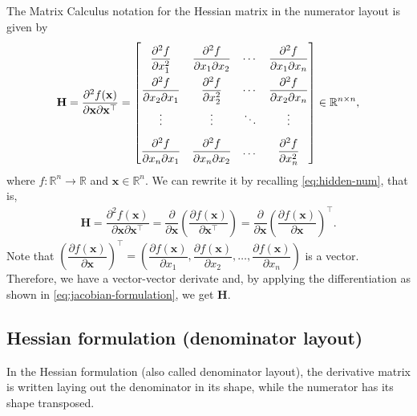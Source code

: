 \documentclass{article}
\begin{document}
The Matrix Calculus notation for the Hessian matrix in the numerator layout is given by
\begin{align}
    \label{eq:hessian-eq-numerator}
    \mathbf{H} = \dfrac{\partial^{2} f(\mathbf{x})}{\partial \mathbf{x} \partial \mathbf{x}^\top} = \renewcommand{\arraystretch}{2.2}\begin{bmatrix}
        \dfrac{\partial^{2} f}{\partial x_1^2} & \dfrac{\partial^{2} f}{\partial x_1 \partial x_2} & \cdots & \dfrac{\partial^{2} f}{\partial x_1 \partial x_n} \\
        \dfrac{\partial^{2} f}{\partial x_2 \partial x_1} & \dfrac{\partial^{2} f}{\partial x_2^2} & \cdots & \dfrac{\partial^{2} f}{\partial x_2 \partial x_n} \\
        \vdots & \vdots & \ddots & \vdots \\
        \dfrac{\partial^{2} f}{\partial x_n \partial x_1} & \dfrac{\partial^{2} f}{\partial x_n \partial x_2} & \dots & \dfrac{\partial^{2} f}{\partial x_n^2}
    \end{bmatrix} \in \mathbb{R}^{n \times n},
\end{align}
where \(f: \mathbb{R}^{n} \rightarrow \mathbb{R}\) and \(\mathbf{x} \in \mathbb{R}^{n}\). We can rewrite it by recalling \eqref{eq:hidden-num}, that is,
\begin{align}
    \mathbf{H} = \dfrac{\partial^{2} f(\mathbf{x})}{\partial \mathbf{x} \partial \mathbf{x}^\top} = \dfrac{\partial }{\partial \mathbf{x}}\left( \dfrac{\partial f(\mathbf{x})}{\partial \mathbf{x}^\top} \right) = \dfrac{\partial }{\partial \mathbf{x}}\left( \dfrac{\partial f(\mathbf{x})}{\partial \mathbf{x}} \right)^\top.
\end{align}
Note that \(\left( \dfrac{\partial f(\mathbf{x})}{\partial \mathbf{x}} \right)^\top = \left( \dfrac{\partial f(\mathbf{x})}{\partial x_1}, \dfrac{\partial f(\mathbf{x})}{\partial x_2}, \dots, \dfrac{\partial f(\mathbf{x})}{\partial x_n} \right)\) is a vector. Therefore, we have a vector-vector derivate and, by applying the differentiation as shown in \eqref{eq:jacobian-formulation}, we get \(\mathbf{H}\).

\subsection{Hessian formulation (denominator layout)}
\label{sec:denominator}

In the Hessian formulation (also called denominator layout), the derivative matrix is written laying out the denominator in its shape, while the numerator has its shape transposed.
\end{document}
